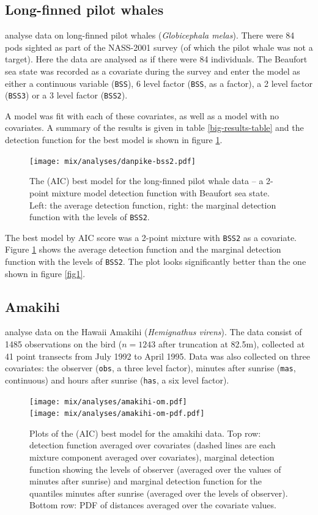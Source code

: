 \subsection{Long-finned pilot whales}
\label{mix-pilotwhales}

 analyse data on long-finned pilot whales (\textit{Globicephala melas}). There were 84 pods sighted as part of the NASS-2001 survey (of which the pilot whale was not a target). Here the data are analysed as if there were 84 individuals. The Beaufort sea state was recorded as a covariate during the survey and enter the model as either a continuous variable (\texttt{BSS}), 6 level factor (\texttt{BSS}, as a factor), a 2 level factor (\texttt{BSS3}) or a 3 level factor (\texttt{BSS2}).

A model was fit with each of these covariates, as well as a model with no covariates. A summary of the results is given in table \ref{big-results-table} and the detection function for the best model is shown in figure \ref{danpike-detfct}.

\begin{figure}[t]
\centering
\texttt{[image: mix/analyses/danpike-bss2.pdf]}
\caption{The (AIC) best model for the long-finned pilot whale data -- a 2-point mixture model detection function with Beaufort sea state. Left: the average detection function, right: the marginal detection function with the levels of \texttt{BSS2}.}
\label{danpike-detfct}
\end{figure}

The best model by AIC score was a 2-point mixture with \texttt{BSS2} as a covariate. Figure \ref{danpike-detfct} shows the average detection function and the marginal detection function with the levels of \texttt{BSS2}. The plot looks significantly better than the one shown in figure \ref{fig1}.

\subsection{Amakihi}
 analyse data on the Hawaii Amakihi (\textit{Hemignathus virens}). The data consist of 1485 observations on the bird ($n=1243$ after truncation at 82.5m), collected at 41 point transects from July 1992 to April 1995. Data was also collected on three covariates: the observer (\texttt{obs}, a three level factor), minutes after sunrise (\texttt{mas}, continuous) and hours after sunrise (\texttt{has}, a six level factor).

\begin{figure}[t]
\centering
\texttt{[image: mix/analyses/amakihi-om.pdf]}\\
\texttt{[image: mix/analyses/amakihi-om-pdf.pdf]}
\caption{Plots of the (AIC) best model for the amakihi data. Top row: detection function averaged over covariates (dashed lines are each mixture component averaged over covariates), marginal detection function showing the levels of observer (averaged over the values of minutes after sunrise) and marginal detection function for the quantiles minutes after sunrise (averaged over the levels of observer). Bottom row: PDF of distances averaged over the covariate values.}
\label{amakihi}
\end{figure}

